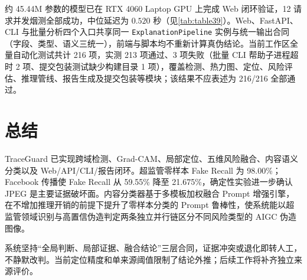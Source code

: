 \documentclass[UTF8, a4paper, 12pt]{ctexart}
\begin{document}
约 45.44M 参数的模型已在 RTX 4060 Laptop GPU 上完成 Web 闭环验证，12 请求并发烟测全部成功，中位延迟为 $0.520$ 秒（见\cref{tab:table39}）。Web、FastAPI、CLI 与批量分析四个入口共享同一 \texttt{ExplanationPipeline} 实例与统一输出合同（字段、类型、语义三统一），前端与脚本均不重新计算真伪结论。当前工作区全量自动化测试共计 216 项，实测 213 项通过、3 项失败（批量 CLI 帮助子进程超时 2 项、提交包装测试缺少构建目录 1 项），覆盖检测、热力图、定位、风险评估、推理管线、报告生成及提交包装等模块；该结果不应表述为 216/216 全部通过。

\section{总结}

TraceGuard 已实现跨域检测、Grad-CAM、局部定位、五维风险融合、内容语义分类以及 Web/API/CLI/报告闭环。超监管零样本 Fake Recall 为 98.00\%；Facebook 传播使 Fake Recall 从 59.55\% 降至 21.675\%，确定性实验进一步确认 JPEG 是主要证据破坏面。内容分类器基于多模板加权融合 Prompt 增强引擎，在不增加推理开销的前提下提升了零样本分类的 Prompt 鲁棒性，使系统能以超监管领域识别与高置信伪造判定两条独立并行链区分不同风险类型的 AIGC 伪造图像。

系统坚持“全局判断、局部证据、融合结论”三层合同，证据冲突或退化即转人工，不静默改判。当前定位精度和单来源阈值限制了结论外推；后续工作将补齐独立来源评价。
\end{document}

